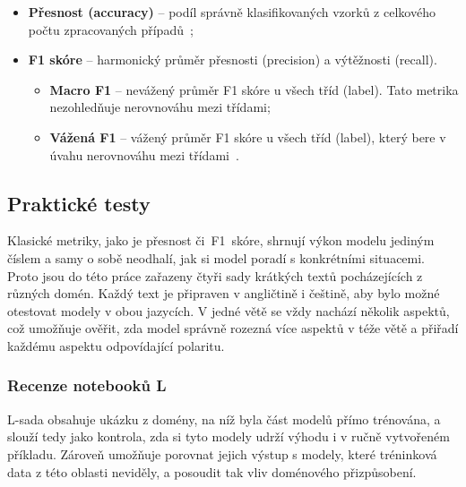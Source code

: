 \begin{itemize}
    \item \textbf{Přesnost (accuracy)} -- podíl správně klasifikovaných vzorků z celkového počtu zpracovaných případů~\cite{HuggTrainAcc};
    \item \textbf{F1 skóre} -- harmonický průměr přesnosti (precision) a výtěžnosti (recall).
    \begin{itemize}
        \item \textbf{Macro F1} -- nevážený průměr F1 skóre u všech tříd (label). Tato metrika nezohledňuje nerovnováhu mezi třídami;
        \item \textbf{Vážená F1} -- vážený průměr F1 skóre u všech tříd (label), který bere v úvahu nerovnováhu mezi třídami~\cite{HuggTrainf1}.
    \end{itemize}
\end{itemize}

\subsection{Praktické testy}\label{praktesty}
Klasické metriky, jako je přesnost či~F1~skóre, shrnují výkon modelu jediným číslem a samy o sobě neodhalí, jak si model poradí s konkrétními situacemi. Proto jsou do této práce zařazeny čtyři sady krátkých textů pocházejících z různých domén. Každý text je připraven v angličtině i češtině, aby bylo možné otestovat modely v obou jazycích. V jedné větě se vždy nachází několik aspektů, což umožňuje ověřit, zda model správně rozezná více aspektů v téže větě a přiřadí každému aspektu odpovídající polaritu.

\subsubsection{Recenze notebooků L}
L-sada obsahuje ukázku z domény, na níž byla část modelů přímo trénována, a slouží tedy jako kontrola, zda si tyto modely udrží výhodu i v ručně vytvořeném příkladu. Zároveň umožňuje porovnat jejich výstup s modely, které tréninková data z této oblasti neviděly, a posoudit tak vliv doménového přizpůsobení.

